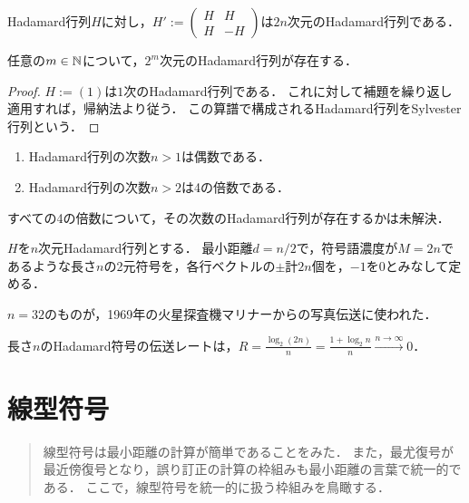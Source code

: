 \documentclass[uplatex,dvipdfmx]{jsreport}
\begin{document}
\begin{lemma}
    Hadamard行列$H$に対し，$H':=\begin{pmatrix}H&H\\H&-H\end{pmatrix}$は$2n$次元のHadamard行列である．
\end{lemma}

\begin{corollary}
    任意の$m\in\mathbb{N}$について，$2^m$次元のHadamard行列が存在する．
\end{corollary}
\begin{proof}
    $H:=(1)$は$1$次のHadamard行列である．
    これに対して補題を繰り返し適用すれば，帰納法より従う．
    この算譜で構成されるHadamard行列をSylvester行列という．
\end{proof}

\begin{proposition}\mbox{}
    \begin{enumerate}
        \item Hadamard行列の次数$n>1$は偶数である．
        \item Hadamard行列の次数$n>2$は4の倍数である．
    \end{enumerate}
\end{proposition}
\begin{remark}
    すべての4の倍数について，その次数のHadamard行列が存在するかは未解決．
\end{remark}

\begin{theorem}
    $H$を$n$次元Hadamard行列とする．
    最小距離$d=n/2$で，符号語濃度が$M=2n$であるような長さ$n$の2元符号を，各行ベクトルの$\pm$計$2n$個を，$-1$を$0$とみなして定める．
\end{theorem}
\begin{history}
    $n=32$のものが，1969年の火星探査機マリナーからの写真伝送に使われた．
\end{history}

\begin{proposition}
    長さ$n$のHadamard符号の伝送レートは，$R=\frac{\log_2(2n)}{n}=\frac{1+\log_2n}{n}\xrightarrow{n\to\infty}0$．
\end{proposition}

\chapter{線型符号}

\begin{quotation}
    線型符号は最小距離の計算が簡単であることをみた．
    また，最尤復号が最近傍復号となり，誤り訂正の計算の枠組みも最小距離の言葉で統一的である．
    ここで，線型符号を統一的に扱う枠組みを鳥瞰する．
\end{quotation}
\end{document}

